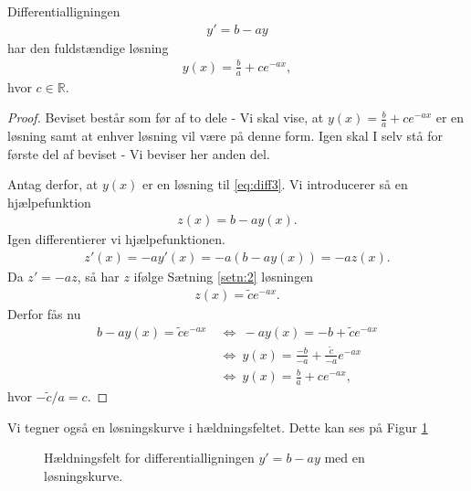 \begin{setn}\label{setn:3}
	Differentialligningen
	\begin{align}\label{eq:diff3}
		y' = b - ay
	\end{align}
	har den fuldstændige løsning
	\begin{align*}
		y(x) = \frac{b}{a} + ce^{-ax},
	\end{align*}
	hvor $c \in \mathbb{R}$.
\end{setn}
\begin{proof}
	Beviset består som før af to dele - Vi skal vise, at $y(x) = \frac{b}{a} +ce^{-ax}$ er en løsning samt at enhver løsning vil være på denne form. Igen skal I selv stå for
	første del af beviset - Vi beviser her anden del.
	
	Antag derfor, at $y(x)$ er en løsning til \eqref{eq:diff3}. Vi introducerer så en hjælpefunktion
	\begin{align*}
		z(x) = b-ay(x). 
	\end{align*}
	Igen differentierer vi hjælpefunktionen. 
	\begin{align*}
		z'(x) = -ay'(x) = -a(b-ay(x)) =-az(x). 
	\end{align*}
	Da $z' = -az$, så har $z$ ifølge Sætning \ref{setn:2} løsningen
	\begin{align*}
		z(x) = \tilde{c}e^{-ax}. 
	\end{align*}
	Derfor fås nu
	\begin{align*}
		b-ay(x) = \tilde{c}e^{-ax} \ &\Leftrightarrow \ -ay(x) = -b+\tilde{c}e^{-ax}\\
		&\Leftrightarrow	\ y(x) = \frac{-b}{-a} + \frac{\tilde{c}}{-a}e^{-ax}\\
		&\Leftrightarrow \ y(x) = \frac{b}{a} + ce^{-ax},
	\end{align*}
	hvor $-\tilde{c}/a = c$. 
\end{proof}
Vi tegner også en løsningskurve i hældningsfeltet. Dette kan ses på Figur \ref{fig:ekspforskudthældkurve}
\begin{figure}[H]
	\centering
	\caption{Hældningsfelt for differentialligningen $y' = b- ay$ med en løsningskurve.}
	\label{fig:ekspforskudthældkurve}
\end{figure}

